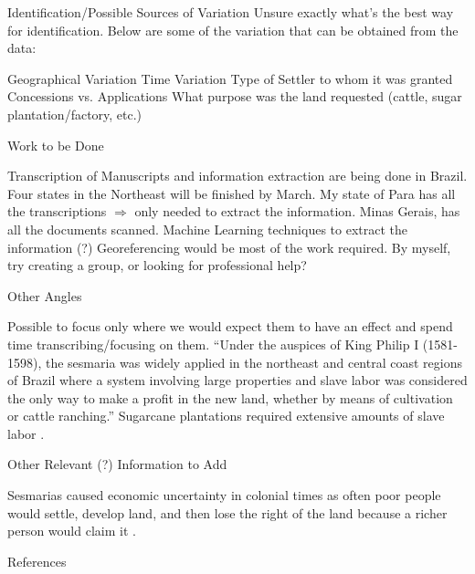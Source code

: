 \documentclass[aspectratio=1610]{beamer}
\begin{document}


\begin{frame}{Identification/Possible Sources of Variation}
    Unsure exactly what's the best way for identification. Below are some of the variation that can be obtained from the data:
    \begin{outline}
        \1 Geographical Variation
        \1 Time Variation
        \1 Type of Settler to whom it was granted
        \1 Concessions vs. Applications
        \1 What purpose was the land requested (cattle, sugar plantation/factory, etc.)
    \end{outline}
\end{frame}

\begin{frame}{Work to be Done}
    \begin{outline}
        \1 Transcription of Manuscripts and information extraction are being done in Brazil.
            \2 Four states in the Northeast will be finished by March.
            \2 My state of Para has all the transcriptions $\Rightarrow$ only needed to extract the information.
            \2 Minas Gerais, has all the documents scanned.
                \3 Machine Learning techniques to extract the information (?)
        \1 Georeferencing would be most of the work required.
            \2 By myself, try creating a group, or looking for professional help?
    \end{outline}
\end{frame}

\begin{frame}{Other Angles}
    \begin{outline}
        \1 Possible to focus only where we would expect them to have an effect and spend time transcribing/focusing on them.
            \2 ``Under the auspices of King Philip I (1581-1598), the sesmaria was widely applied in the northeast and central coast regions of Brazil where a system involving large properties and slave labor was considered the only way to make a profit in the new land, whether by means of cultivation or cattle ranching.''\parencite{Lobb1976-mc}
            \2 Sugarcane plantations required extensive amounts of slave labor \parencite{Silva2019-vj}.
    \end{outline}
\end{frame}

\begin{frame}{Other Relevant (?) Information to Add}
    \begin{outline}
        \1 Sesmarias caused economic uncertainty in colonial times as often poor people would settle, develop land, and then lose the right of the land because a richer person would claim it \parencite[p.~142]{Da_Costa_Porto1979-dz}.
    \end{outline}
\end{frame}

\begin{frame}[allowframebreaks, t]{References}
    \printbibliography
\end{frame}
\end{document}
